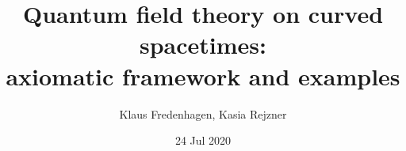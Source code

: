 \documentclass[12pt]{article}
\date{24 Jul 2020}
\newcommand{\1}{\mathds{1}}                         %
\begin{document}
\title{Quantum field theory on curved spacetimes:\\ axiomatic framework and examples}
\author{Klaus Fredenhagen, Kasia Rejzner}
\maketitle
 \theoremstyle{plain}
  \newtheorem{df}{Definition}[section]
  \newtheorem{thm}[df]{Theorem}
  \newtheorem{prop}[df]{Proposition}
  \newtheorem{cor}[df]{Corollary}
  \newtheorem{lemma}[df]{Lemma}
    \newtheorem{exa}[df]{Example}
\end{document}
